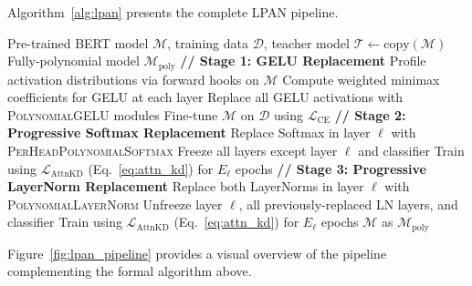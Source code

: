 Algorithm~\ref{alg:lpan} presents the complete LPAN pipeline.

\begin{algorithm}[htbp]
\caption{LPAN: Learnable Polynomial Approximation Network}
\label{alg:lpan}
\begin{algorithmic}[1]
\REQUIRE Pre-trained BERT model $\mathcal{M}$, training data $\mathcal{D}$, teacher model $\mathcal{T} \leftarrow \text{copy}(\mathcal{M})$
\ENSURE Fully-polynomial model $\mathcal{M}_{\text{poly}}$
\STATE \textbf{// Stage 1: GELU Replacement}
\STATE Profile activation distributions via forward hooks on $\mathcal{M}$
\STATE Compute weighted minimax coefficients for GELU at each layer
\STATE Replace all GELU activations with \textsc{PolynomialGELU} modules
\STATE Fine-tune $\mathcal{M}$ on $\mathcal{D}$ using $\mathcal{L}_{\mathrm{CE}}$ 
\STATE \textbf{// Stage 2: Progressive Softmax Replacement}
    \STATE Replace Softmax in layer $\ell$ with \textsc{PerHeadPolynomialSoftmax}
    \STATE Freeze all layers except layer $\ell$ and classifier
    \STATE Train using $\mathcal{L}_{\mathrm{AttnKD}}$ (Eq.~\ref{eq:attn_kd}) for $E_\ell$ epochs
\ENDFOR
\STATE \textbf{// Stage 3: Progressive LayerNorm Replacement}
    \STATE Replace both LayerNorms in layer $\ell$ with \textsc{PolynomialLayerNorm}
    \STATE Unfreeze layer $\ell$, all previously-replaced LN layers, and classifier 
    \STATE Train using $\mathcal{L}_{\mathrm{AttnKD}}$ (Eq.~\ref{eq:attn_kd}) for $E_\ell$ epochs
\ENDFOR
\RETURN $\mathcal{M}$ as $\mathcal{M}_{\text{poly}}$
\end{algorithmic}
\end{algorithm}

Figure~\ref{fig:lpan_pipeline} provides a visual overview of the pipeline complementing the formal algorithm above.

